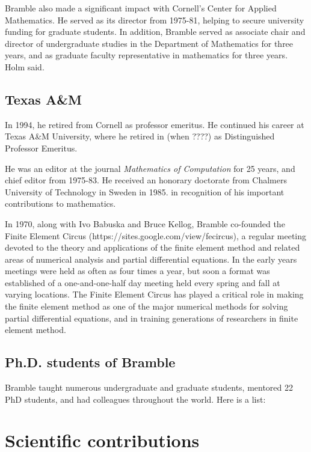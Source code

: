 \documentclass[CJK,11pt]{amsart}
\theoremstyle{definition}
\begin{document}
\begin{CJK*}{UTF8}{gbsn}
Bramble also made a significant impact with Cornell’s Center for Applied Mathematics. He served as its director from 1975-81, helping to secure university funding for graduate students.  In addition, Bramble served as associate chair and director of undergraduate studies in the Department of Mathematics for three years, and as graduate faculty representative in mathematics for three years.  Holm said.

\subsection{Texas A\&M}
In 1994, he retired from Cornell as professor emeritus. He continued his career at Texas A\&M University, where he retired in (when ????) as Distinguished Professor Emeritus. 

He was an editor at the journal {\it Mathematics of Computation} for 25 years, and chief editor from 1975-83. He received an honorary doctorate from Chalmers University of Technology in Sweden in 1985.  in recognition of his important contributions to mathematics.

In 1970, along with Ivo Babuska and Bruce Kellog, Bramble co-founded the Finite Element Circus (https://sites.google.com/view/fecircus), a regular meeting devoted to the theory and applications of the finite element method and related areas of numerical analysis and partial differential equations.  In the early years meetings were held as often as four times a year, but soon a format was established of a one-and-one-half day meeting held every spring and fall at varying locations.  The Finite Element Circus has played a critical role in making the finite element method as one of the major numerical methods for solving partial differential equations, and in training generations of researchers in finite element method.

\subsection{Ph.D. students of Bramble}
Bramble taught numerous undergraduate and graduate students, mentored 22 PhD students, and had colleagues throughout the world. Here is a list:


\section{Scientific contributions}



\end{CJK*}
\end{document}
